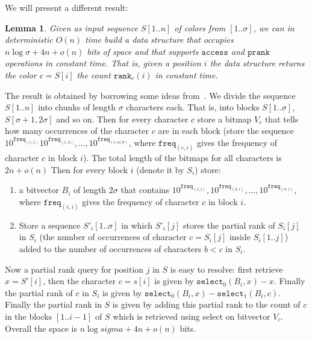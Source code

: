 \documentclass[a4paper]{article}
\newtheorem{lemma}{Lemma}
\begin{document}
We will present a different result: 
\begin{lemma}
\label{lemma:build_prank}
Given as input sequence $S[1..n]$ of colors from $[1..\sigma]$, 
we can in deterministic $O(n)$ time 
build a data structure that occupies $n\log\sigma+4n+o(n)$
bits of space and that supports $\mathtt{access}$ and 
$\mathtt{prank}$ operations in constant time. That is, 
given a position $i$ the data structure returns the color 
$c=S[i]$ the count $\mathtt{rank}_c(i)$ in constant time. 
\end{lemma}
The result is obtained by borrowing some ideas from~\cite{GMR06}. 
We divide the sequence $S[1..n]$ into chunks of length $\sigma$ 
characters each. That is, into blocks $S[1..\sigma]$, 
$S[\sigma+1,2\sigma]$ and so on. Then for every 
character $c$ store a bitmap $V_c$ that tells how many occurrences 
of the character $c$ are in each block (store the sequence 
$10^{\mathtt{freq}_{(c,1)}}10^{\mathtt{freq}_{(c,2)}},\ldots,10^{\mathtt{freq}_{(c,n/\sigma)}}$, 
where $\mathtt{freq}_{(c,i)}$ gives the frequency of character $c$
in block $i$). The total length 
of the bitmaps for all characters is $2n+o(n)$
Then for every block $i$ (denote it by $S_i$) store:
\begin{enumerate}
\item a bitvector $B_i$ of length $2\sigma$ that contains 
$10^{\mathtt{freq}_{(1,i)}}, 10^{\mathtt{freq}_{(2,i)}},\ldots,10^{\mathtt{freq}_{(\sigma,i)}}$, 
where $\mathtt{freq}_{(c,i)}$ gives the frequency of character $c$
in block $i$. 
\item Store a sequence $S'_i[1..\sigma]$ in which 
$S'_i[j]$ stores the partial rank of $S_i[j]$ in $S_i$
(the number of occurrences of character 
$c=S_i[j]$ inside $S_i[1..j]$) added to the number 
of occurrences of characters $b<c$ in $S_i$. 
\end{enumerate}
Now a partial rank query for position $j$ in $S$ is easy 
to resolve: first retrieve $x=S'[i]$, then the character $c=s[i]$
is given by $\mathtt{select}_0(B_i,x)-x$.
Finally the partial rank of $c$ in $S_i$  is given by $\mathtt{select}_0(B_i,x)-\mathtt{select}_1(B_i,c)$. 
Finally the partial rank in $S$ is given by adding this partial 
rank to the count of $c$ in the blocks $[1..i-1]$ of $S$ which is retrieved 
using select on bitvector $V_c$. Overall the space is $n\log sigma+4n+o(n)$ bits. 
\end{document}
